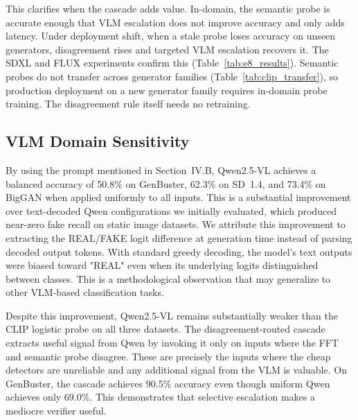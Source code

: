 \documentclass{ieeeaccess}
\begin{document}
This clarifies when the cascade adds value. In-domain, the semantic probe is accurate
enough that VLM escalation does not improve accuracy and only adds latency. Under
deployment shift, when a stale probe loses accuracy on unseen generators, disagreement
rises and targeted VLM escalation recovers it. The SDXL and FLUX experiments confirm
this (Table~\ref{tab:e8_results}). Semantic probes do not transfer across generator
families (Table~\ref{tab:clip_transfer}), so production deployment on a new generator
family requires in-domain probe training. The disagreement rule itself needs no
retraining.

\subsection{VLM Domain Sensitivity}

By using the prompt mentioned in Section~IV.B, Qwen2.5-VL achieves a balanced accuracy of 50.8\% on GenBuster, 62.3\% on SD~1.4, and 73.4\% on BigGAN when applied uniformly to all inputs. This is a substantial improvement over text-decoded Qwen configurations we initially evaluated, which produced near-zero fake recall on static image datasets. We attribute this improvement to extracting the REAL/FAKE logit difference at generation time instead of parsing decoded output tokens. With standard greedy decoding, the model's text outputs were biased toward "REAL" even when its underlying logits distinguished between classes. This is a methodological observation that may generalize to other VLM-based classification tasks.

Despite this improvement, Qwen2.5-VL remains substantially weaker than the CLIP logistic probe on all three datasets. 
The disagreement-routed cascade extracts useful signal from Qwen by invoking it only
on inputs where the FFT and semantic probe disagree. These are precisely the inputs
where the cheap detectors are unreliable and any additional signal from the VLM is
valuable. On GenBuster, the cascade achieves 90.5\% accuracy even though uniform
Qwen achieves only 69.0\%.
 This demonstrates that selective escalation makes a mediocre verifier useful.
\end{document}
